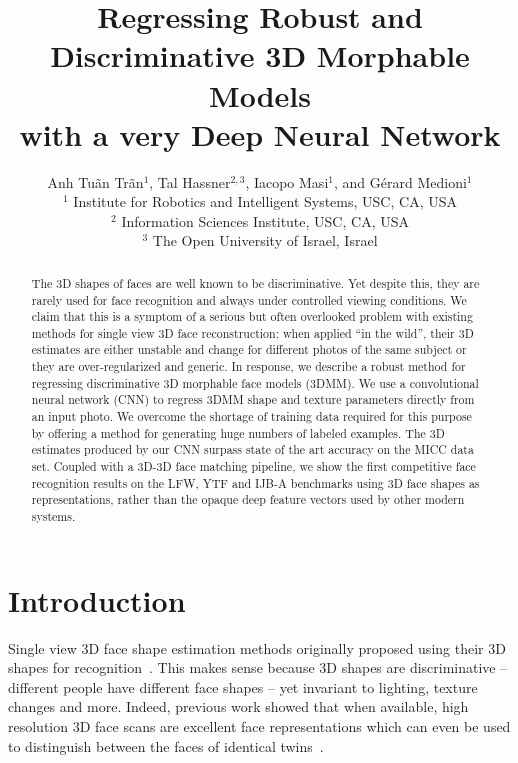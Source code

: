 \documentclass[10pt,twocolumn,letterpaper]{article}
\begin{document}
\title{Regressing Robust and Discriminative 3D Morphable Models\\with a very Deep Neural Network\vspace{-3mm}}


\author{Anh Tu\~{a}n Tr\~{a}n$^1$, Tal Hassner$^{2,3}$, Iacopo Masi$^1$, and G\'{e}rard Medioni$^1$\\
{\small $^{1}$ Institute for Robotics and Intelligent Systems, USC, CA, USA}\\
{\small $^{2}$ Information Sciences Institute, USC, CA, USA}\\
{\small $^{3}$ The Open University of Israel, Israel}}



\maketitle



\begin{abstract}
The 3D shapes of faces are well known to be discriminative. Yet despite this, they are rarely used for face recognition and always under controlled viewing conditions. We claim that this is a symptom of a serious but often overlooked problem with existing methods for single view 3D face reconstruction: when applied ``in the wild'', their 3D estimates are either unstable and change for different photos of the same subject or they are over-regularized and generic. In response, we describe a robust method for regressing discriminative 3D morphable face models (3DMM). We use a convolutional neural network (CNN) to regress 3DMM shape and texture parameters directly from an input photo. We overcome the shortage of training data required for this purpose by offering a method for generating huge numbers of labeled  examples. The 3D estimates produced by our CNN surpass state of the art accuracy on the MICC data set. Coupled with a 3D-3D face matching pipeline, we show the first competitive face recognition results on the LFW, YTF and IJB-A benchmarks using 3D face shapes as representations, rather than the opaque deep feature vectors used by other modern systems.\vspace{-5mm}
\end{abstract}

\section{Introduction}
Single view 3D face shape estimation methods originally proposed using their 3D shapes for recognition~\cite{blanz2002face,blanz2003face,paysan09basel}. This makes sense because 3D shapes are discriminative -- different people have different face shapes -- yet invariant to lighting, texture changes and more. Indeed, previous work showed that when available, high resolution 3D face scans are excellent face representations which can even be used to distinguish between the faces of identical twins~\cite{bronstein2005three}. 
\end{document}
